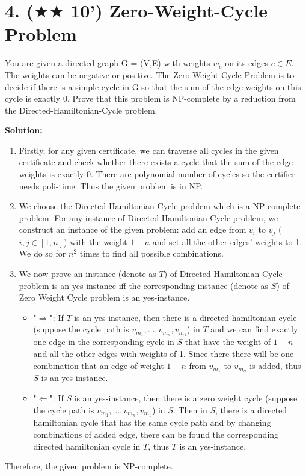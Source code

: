 \documentclass{article}
\begin{document}
\pagebreak
\section*{4. ($\bigstar\bigstar$ 10') Zero-Weight-Cycle Problem}
You are given a directed graph G = (V,E) with weights $w_e$ on its edges $e \in E$. The weights can be negative or positive. The Zero-Weight-Cycle Problem is to decide if there is a simple cycle in G so that the sum of the edge weights on this cycle is exactly 0. Prove that this problem is NP-complete by a reduction from the Directed-Hamiltonian-Cycle problem.
{\color{blue}
\par\textbf{Solution: }
\begin{enumerate}
	\item Firstly, for any given certificate, we can traverse all cycles in the given certificate and check whether there exists a cycle that the sum of the edge weights is exactly 0. There are polynomial number of cycles so the certifier needs poli-time. Thus the given problem is in NP.	\item We choose the Directed Hamiltonian Cycle problem which is a NP-complete problem. For any instance of Directed Hamiltonian Cycle problem, we construct an instance of the given problem: add an edge from $v_i$ to $v_j$ ($i,j \in [1,n]$) with the weight $1 - n$ and set all the other edges' weights to 1. We do so for $n^2$ times to find all possible combinations.
	\item We now prove an instance (denote as $T$) of Directed  Hamiltonian Cycle problem is an yes-instance iff the corresponding instance (denote as $S$) of Zero Weight Cycle problem is an yes-instance.
	\begin{itemize}
		\item "$\Rightarrow$": If $T$ is an yes-instance, then there is a directed hamiltonian cycle (suppose the cycle path is $v_{m_1}, \ldots, v_{m_n}, v_{m_1}$) in $T$ and we can find exactly one edge in the corresponding cycle in $S$ that have the weight of $1 - n$ and all the other edges with weights of 1. Since there there will be one combination that an edge of weight $1 - n$ from $v_{m_1}$ to $v_{m_n}$ is added, thus $S$ is an yes-instance.
		\item "$\Leftarrow$": If $S$ is an yes-instance, then there is a zero weight cycle (suppose the cycle path is $v_{m_1}, \ldots, v_{m_n}, v_{m_1}$) in $S$. Then in $S$, there is a directed hamiltonian cycle that has the same cycle path and by changing combinations of added edge, there can be found the corresponding directed hamiltonian cycle in $T$, thus $T$ is an yes-instance.
	\end{itemize}
\end{enumerate}
\par Therefore, the given problem is NP-complete.
}
\end{document}
